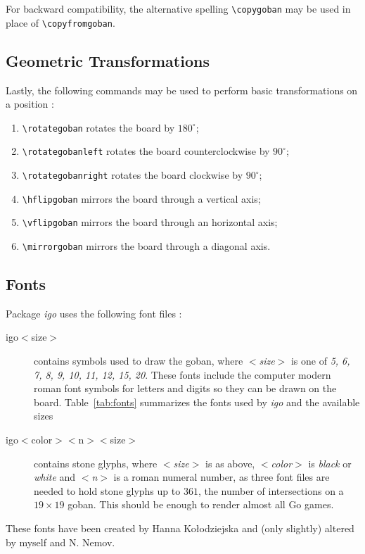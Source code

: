 \documentclass[fleqn]{article}
\begin{document}
For backward compatibility, the alternative spelling \verb|\copygoban| may be used in place of \verb|\copyfromgoban|.

\subsection{Geometric Transformations}

Lastly, the following commands may be used to perform basic transformations on a position :
\begin{enumerate}
	\item
		\verb|\rotategoban| rotates the board by $180^\circ$;
	\item
		\verb|\rotategobanleft| rotates the board counterclockwise by $90^\circ$;
	\item
		\verb|\rotategobanright| rotates the board clockwise by $90^\circ$;
	\item
		\verb|\hflipgoban| mirrors the board through a vertical axis;
	\item
		\verb|\vflipgoban| mirrors the board through an horizontal axis;
	\item
		\verb|\mirrorgoban| mirrors the board through a diagonal axis.
\end{enumerate}

\subsection{Fonts}

Package \textit{igo} uses the following font files :
\begin{description}
	\item [igo$<$size$>$] contains symbols used to draw the goban, where $<$\textit{size}$>$ is one of \textit{5, 6, 7, 8, 9, 10, 11, 12, 15, 20}. These fonts include the computer modern roman font symbols for letters and digits so they can be drawn on the board. Table~\ref{tab:fonts} summarizes the fonts used by \textit{igo} and the available sizes
	\item [igo$<$color$>$$<$n$>$$<$size$>$] contains stone glyphs, where $<$\textit{size}$>$ is as above, $<$\textit{color}$>$ is \textit{black} or \textit{white} and $<$\textit{n}$>$ is a roman numeral number, as three font files are needed to hold stone glyphs up to $361$, the number of intersections on a $19 \times 19$ goban. This should be enough to render almost all Go games.
\end{description}
These fonts have been created by Hanna Ko{\l}odziejska and (only slightly) altered by myself and N. Nemov.
\end{document}
